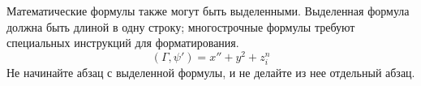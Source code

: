 \documentclass{article}      %
\newcommand{\ip}[2]{(#1, #2)}%
\begin{document}
Математические формулы также могут быть выделенными.
Выделенная формула должна быть длиной в одну строку;
многострочные формулы требуют специальных инструкций
для форматирования.
   \[  \ip{\Gamma}{\psi'} = x'' + y^{2} + z_{i}^{n}\]
Не начинайте абзац с выделенной формулы, и не делайте из
нее отдельный абзац.
\end{document}
